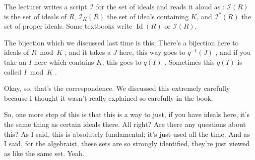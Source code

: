 \begin{aiNote}
The lecturer writes a script $\mathscr{I}$ for the set of ideals and reads it aloud as : $\mathscr{I}(R)$ is the set of ideals of $R$, $\mathscr{I}_K(R)$ the set of ideals containing $K$, and $\mathscr{I}^*(R)$ the set of proper ideals. Some textbooks write $\operatorname{Id}(R)$ or $\mathcal{I}(R)$.
\end{aiNote}

\begin{speech}[00:01:36 - 00:02:37]
The bijection which we discussed last time is this: There's a bijection here to ideals of $R \bmod K$ , and it takes a $J$ here, this way goes to $q^{-1}(J)$ , and if you take an $I$ here which contains $K$, this goes to $q(I)$ . Sometimes this $q(I)$ is called $I \bmod K$ .

Okay, so, that's the correspondence. We discussed this extremely carefully because I thought it wasn't really explained so carefully in the book.

So, one more step of this is that this is a way to just, if you have ideals here, it's the same thing as certain ideals there. All right? Are there any questions about this? As I said, this is absolutely fundamental; it's just used all the time. And as I said, for the algebraist, these sets are so strongly identified, they're just viewed as like the same set. Yeah.
\end{speech}

\begin{content}
\end{content}


